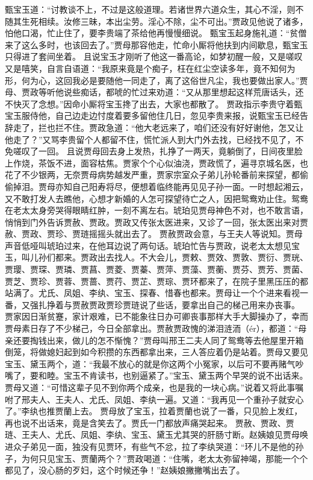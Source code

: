 \documentclass[12pt,oneside]{book}
\begin{document}
甄宝玉道：“讨教谈不上，不过是这般道理。若诸世界六道众生，其心不淫，则不随其生死相续。汝修三昧，本出尘劳。淫心不除，尘不可出。”贾政见他说了诸多，怕他口渴，忙止住了，要李贵端了茶给他再慢慢细说。
甄宝玉起身施礼道：“贫僧来了这么多时，也该回去了。”贾母那容他走，忙命小厮将他扶到内间歇息，甄宝玉只得进了套间坐着。
且说宝玉才刚听了他这一番高论，如梦初醒一般，又是嗟叹又是嘻笑，自言自语道：“我原来竟是个痴子，枉在红尘空读多年，竟不知何为形，何为心，这回我必是要随他一同走了，离了这俗世凡尘，我也要做出家人。”贾母、贾政等听他说些痴话，都唬的忙过来劝道：“又从那里想起这样荒唐话头，还不快灭了念想。”因命小厮将宝玉搀了出去，大家也都散了。
贾政指示李贵守着甄宝玉服侍他，自己边走边忖度着要多留他住几日，忽见李贵来报，说甄宝玉已经告辞走了，拦也拦不住。贾政急道：“他大老远来了，咱们还没有好好谢他，怎又让他走了？”又骂李贵留个人都留不住，慌忙派人到大门外去找，已经找不见了，不免嗟叹了一回。
且说贾母回去身上发热，扎挣了一两天，竟躺倒了，日间夜里脸上作烧，茶饭不进，面容枯焦。贾家个个心似油浇，贾政慌了，遍寻京城名医，也花了不少银两，无奈贾母病势越发严重，贾家宗室众子弟儿孙轮番前来探望，都偷偷掉泪。贾母亦知自己阳寿将尽，便想着临终能再见见子孙一面。一时想起湘云，又不敢打发人去瞧他，心想才新婚的人怎可探望待亡之人，因把鸳鸯劝止住。鸳鸯在老太太身旁哭得眼睛红肿，一刻不离左右。琥珀见贾母神色不对，也不敢言语，悄悄到门外告诉贾赦、贾政。贾政又传张太医进来，又诊了一回，张太医出来对贾赦、贾政、贾珍、贾琏摇摇头就出去了。
贾赦贾政会意，与王夫人等说知。贾母声音低哑叫琥珀过来，在他耳边说了两句话。琥珀忙告与贾政，说老太太想见宝玉，叫儿孙们都来。贾政出去找人。不大会儿，贾敕、贾效、贾敦、贾衍、贾珖、贾璎、贾琛、贾璘、贾菖、贾菱、贾蓁、贾萍、贾藻、贾蘅、贾芬、贾芳、贾菌、贾芝、贾珍、贾蓉、贾蔷、贾荇、贾芷、贾琮、贾环都来了，在院子里黑压压的都站满了。尤氏、凤姐、李纨、宝玉、探春、惜春也都来。贾母让一个个进来看视一番，又强扎挣着与贾赦贾政贾珍贾琏说了些话，要拿出自己的梯己用来办丧事。
贾家因日渐贫蹇，家计艰难，已不能象往日办可卿丧事那样大手大脚操办了，幸而贾母素日存了不少梯己，今日全部拿出。贾赦贾政愧的涕泪涟洏（ér），都道：“母亲还要掏钱出来，做儿的怎不惭愧？”贾母叫邢王二夫人同了鸳鸯等去他屋里开箱倒笼，将做媳妇起到如今积攒的东西都拿出来，三人答应着仍是站着。贾母又要见宝玉、黛玉两个，道：“我最不放心的就是你这两个小冤家，以后可不要再赌气吵嘴了，要和睦。宝玉不肯读书，也别逼紧了。”宝玉、黛玉两个早哭的说不出话来。贾母又道：“可惜这辈子见不到你两个成亲，也是我的一块心病。”说着又将此事嘱咐了邢夫人、王夫人、尤氏、凤姐、李纨一遍。又道：“我再见一个重孙子就安心了。”李纨也推贾蘭上去。
贾母放了宝玉，拉着贾蘭也说了一番，只见脸上发红，再也说不出话来，竟是含笑去了。贾氏一门都放声痛哭起来。
贾赦、贾政、贾琏、王夫人、尤氏、凤姐、李纨、宝玉、黛玉尤其哭的肝肠寸断。赵姨娘见贾母唤进众子弟见一面，独没有见贾环，有些气不忿，拉了李纨哭道：“环儿不是他的孙子，为何只见宝玉、贾蘭两个？”贾政喝道：“住嘴，老太太弥留神竭，那能一个个都见了，没心肠的歹妇，这个时候还争！”赵姨娘撇撇嘴出去了。
\end{document}
